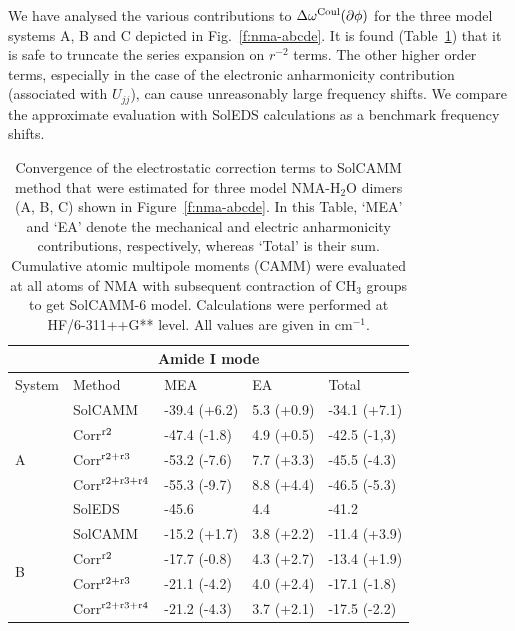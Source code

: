 \documentclass[a4paper,titlepage,twoside,fleqn,12pt]{book}
\begin{document}
\begin{appendices}
We have analysed the various contributions to $\Delta\omega^{\rm Coul}(\partial\phi)$
for the three model systems A, B and C depicted in Fig.~\ref{f:nma-abcde}. It is found 
(Table~\ref{t:ctest}) that
it is safe to truncate the series expansion on $r^{-2}$ terms. The other higher order terms,
especially in the case of the electronic anharmonicity contribution 
(associated with $U_{jj}$), can cause unreasonably
large frequency shifts. 
We compare the approximate evaluation with SolEDS calculations as a benchmark frequency shifts.

\begin{table}[ht]
\caption{Convergence of the electrostatic correction terms to SolCAMM
method that were estimated for three model NMA-H$_2$O dimers (A, B, C)
shown in Figure~\ref{f:nma-abcde}. In this Table, `MEA' and `EA' denote the mechanical and electric
anharmonicity contributions, respectively, whereas `Total' is their sum.
Cumulative atomic multipole moments (CAMM) were evaluated 
at all atoms of NMA with subsequent contraction of CH$_3$ groups 
to get SolCAMM-6 model.
Calculations were performed at HF/6-311++G** level.
All values are given in cm$^{-1}$.
\label{t:ctest}}
\begin{tabular*}{1.0\textwidth}{@{\extracolsep{\fill} } l ll ll}
\hline\hline
\multicolumn{5}{c}{Amide I mode} \\
\hline
System               & Method    & MEA           & EA         & Total        \\
\hline
\multirow{5}{*}{A}   & SolCAMM   & -39.4 (+6.2)  & 5.3 (+0.9) & -34.1 (+7.1) \\
        & Corr$^{\rm r2}$        & -47.4 (-1.8)  & 4.9 (+0.5) & -42.5 (-1,3) \\
        & Corr$^{\rm r2+r3}$     & -53.2 (-7.6)  & 7.7 (+3.3) & -45.5 (-4.3) \\
        & Corr$^{\rm r2+r3+r4}$  & -55.3 (-9.7)  & 8.8 (+4.4) & -46.5 (-5.3) \\
                     & SolEDS    & -45.6         & 4.4        & -41.2        \\
\hline
\multirow{5}{*}{B}   & SolCAMM   & -15.2 (+1.7)  & 3.8 (+2.2) & -11.4 (+3.9) \\
        & Corr$^{\rm r2}$        & -17.7 (-0.8)  & 4.3 (+2.7) & -13.4 (+1.9) \\
        & Corr$^{\rm r2+r3}$     & -21.1 (-4.2)  & 4.0 (+2.4) & -17.1 (-1.8) \\
        & Corr$^{\rm r2+r3+r4}$  & -21.2 (-4.3)  & 3.7 (+2.1) & -17.5 (-2.2) \\

\end{tabular*}
\end{table}
\end{appendices}
\end{document}
